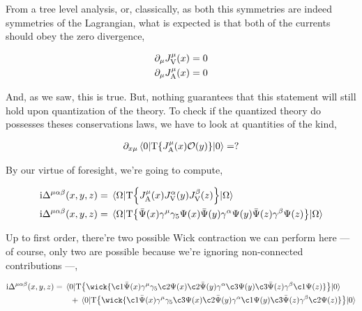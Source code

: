 From a tree level analysis, or, classically, as both this symmetries are indeed symmetries of the Lagrangian, 
what is expected is that both of the currents should obey the zero divergence,

\begin{align}
    \partial_\mu J_{\textnormal V}^\mu\qty(x)&=0\nonumber\\
    \partial_\mu J_{\textnormal A}^\mu\qty(x)&=0\nonumber
\end{align}

And, as we saw, this is true. But, nothing guarantees that this statement will still hold upon quantization 
of the theory. To check if the quantized theory do possesses theses conservations laws, we have to  look at 
quantities of the kind,

\begin{align}
    \partial_{x\mu}\mel{0}{\textnormal{T}\qty{J_{\textnormal A}^\mu\qty(x)\mathcal O\qty(y)}}{0}=?\nonumber
\end{align}

By our virtue of foresight, we're going to compute,

\begin{align}
    \textnormal{i}\Delta^{\mu\alpha\beta}\qty(x,y,z)&=
    \mel{\Omega}{\textnormal{T}\qty{J_{\textnormal A}^\mu\qty(x)
        J_{\textnormal V}^\alpha\qty(y)J_{\textnormal V}^\beta\qty(z)}}{\Omega}\nonumber\\
    \textnormal{i}\Delta^{\mu\alpha\beta}\qty(x,y,z)&=
    \mel{\Omega}{\textnormal{T}\qty{\bar\Psi\qty(x)\gamma^\mu\gamma_5\Psi\qty(x)
        \bar\Psi\qty(y)\gamma^\alpha\Psi\qty(y)
        \bar\Psi\qty(z)\gamma^\beta\Psi\qty(z)}}{\Omega}\nonumber
\end{align}

Up to first order, there're two possible Wick contraction we can perform here --- of course, only two are possible because we're 
ignoring non-connected contributions ---, 

\begin{align}
    \im\Delta^{\mu\alpha\beta}\qty(x,y,z)&=
    \mel{0}{\textnormal{T}\qty{\wick{\c1{\bar{\Psi}}\qty(x)\gamma^\mu\gamma_5\c2{\Psi}\qty(x)
        \c2{\bar{\Psi}}\qty(y)\gamma^\alpha\c3{\Psi}\qty(y)
        \c3{\bar{\Psi}}\qty(z)\gamma^\beta\c1{\Psi}\qty(z)}}}{0}\nonumber\\
        &\quad\quad+
    \mel{0}{\textnormal{T}\qty{\wick{\c1{\bar{\Psi}}\qty(x)\gamma^\mu\gamma_5\c3{\Psi}\qty(x)
        \c2{\bar{\Psi}}\qty(y)\gamma^\alpha\c1{\Psi}\qty(y)
        \c3{\bar{\Psi}}\qty(z)\gamma^\beta\c2{\Psi}\qty(z)}}}{0}\nonumber
\end{align}

